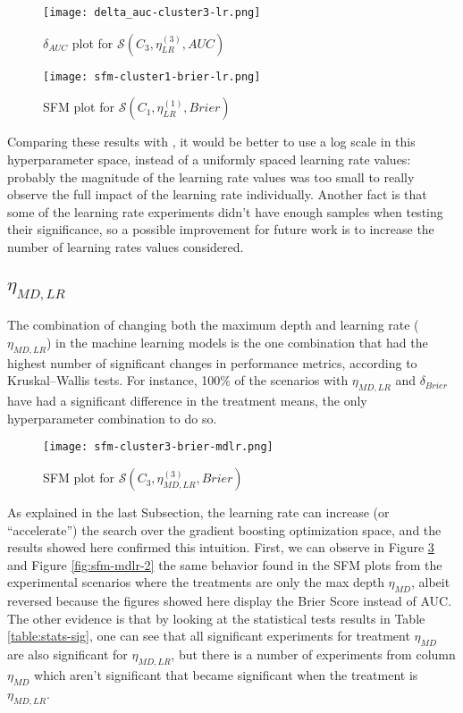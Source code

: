 \begin{figure}[H]
    \centering
    \texttt{[image: delta\_auc-cluster3-lr.png]}
    \caption{$\delta_{AUC}$ plot for $\mathcal{S}(C_3, \eta^{(3)}_{LR}, AUC)$}
    \label{fig:delta-auc-cluster3-lr}
\end{figure}

\begin{figure}[H]
    \centering
    \texttt{[image: sfm-cluster1-brier-lr.png]}
    \caption{SFM plot for $\mathcal{S}(C_1, \eta^{(1)}_{LR}, Brier)$}
    \label{fig:sfm-lr-1}
\end{figure}

Comparing these results with \cite{van2018hyperparameter}, it would be better to use a log scale in this hyperparameter space, instead of a uniformly spaced learning rate values: probably the magnitude of the learning rate values was too small to really observe the full impact of the learning rate individually. Another fact is that some of the learning rate experiments didn't have enough samples when testing their significance, so a possible improvement for future work is to increase the number of learning rates values considered.

\subsection{\texorpdfstring{\Large$\eta_{MD, LR}$}{}}

The combination of changing both the maximum depth and learning rate ($\eta_{MD, LR}$) in the machine learning models is the one combination that had the highest number of significant changes in performance metrics, according to Kruskal–Wallis tests. For instance, 100\% of the scenarios with $\eta_{MD, LR}$ and $\delta_{Brier}$ have had a significant difference in the treatment means, the only hyperparameter combination to do so.


\begin{figure}[H]
    \centering
    \texttt{[image: sfm-cluster3-brier-mdlr.png]}
    \caption{SFM plot for $\mathcal{S}(C_3, \eta^{(3)}_{MD, LR}, Brier)$}
    \label{fig:sfm-mdlr-1}
\end{figure}

As explained in the last Subsection, the learning rate can increase (or ``accelerate'') the search over the gradient boosting optimization space, and the results showed here confirmed this intuition. First, we can observe in Figure \ref{fig:sfm-mdlr-1} and Figure \ref{fig:sfm-mdlr-2} the same behavior found in the SFM plots from the experimental scenarios where the treatments are only the max depth $\eta_{MD}$, albeit reversed because the figures showed here display the Brier Score instead of AUC. The other evidence is that by looking at the statistical tests results in Table \ref{table:stats-sig}, one can see that all significant experiments for treatment $\eta_{MD}$ are also significant for $\eta_{MD, LR}$, but there is a number of experiments from column $\eta_{MD}$ which aren't significant that became significant when the treatment is $\eta_{MD, LR}$. 


